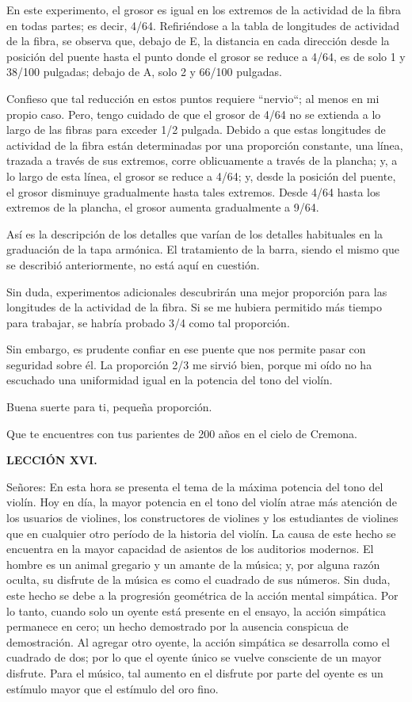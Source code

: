 \documentclass[12pt]{book}
\begin{document}
En este experimento, el grosor es igual en los extremos de la actividad de la fibra en todas partes; es decir, 4/64. Refiriéndose a la tabla de longitudes de actividad de la fibra, se observa que, debajo de E, la distancia en cada dirección desde la posición del puente hasta el punto donde el grosor se reduce a 4/64, es de solo 1 y 38/100 pulgadas; debajo de A, solo 2 y 66/100 pulgadas.

Confieso que tal reducción en estos puntos requiere ``nervio``; al menos en mi propio caso. Pero, tengo cuidado de que el grosor de 4/64 no se extienda a lo largo de las fibras para exceder 1/2 pulgada. Debido a que estas longitudes de actividad de la fibra están determinadas por una proporción constante, una línea, trazada a través de sus extremos, corre oblicuamente a través de la plancha; y, a lo largo de esta línea, el grosor se reduce a 4/64; y, desde la posición del puente, el grosor disminuye gradualmente hasta tales extremos. Desde 4/64 hasta los extremos de la plancha, el grosor aumenta gradualmente a 9/64.

Así es la descripción de los detalles que varían de los detalles habituales en la graduación de la tapa armónica. El tratamiento de la barra, siendo el mismo que se describió anteriormente, no está aquí en cuestión.

Sin duda, experimentos adicionales descubrirán una mejor proporción para las longitudes de la actividad de la fibra. Si se me hubiera permitido más tiempo para trabajar, se habría probado 3/4 como tal proporción.

Sin embargo, es prudente confiar en ese puente que nos permite pasar con seguridad sobre él. La proporción 2/3 me sirvió bien, porque mi oído no ha escuchado una uniformidad igual en la potencia del tono del violín.

Buena suerte para ti, pequeña proporción.

Que te encuentres con tus parientes de 200 años en el cielo de Cremona.

\textbf{LECCIÓN XVI.}

Señores: En esta hora se presenta el tema de la máxima potencia del tono del violín. Hoy en día, la mayor potencia en el tono del violín atrae más atención de los usuarios de violines, los constructores de violines y los estudiantes de violines que en cualquier otro período de la historia del violín. La causa de este hecho se encuentra en la mayor capacidad de asientos de los auditorios modernos. El hombre es un animal gregario y un amante de la música; y, por alguna razón oculta, su disfrute de la música es como el cuadrado de sus números. Sin duda, este hecho se debe a la progresión geométrica de la acción mental simpática. Por lo tanto, cuando solo un oyente está presente en el ensayo, la acción simpática permanece en cero; un hecho demostrado por la ausencia conspicua de demostración. Al agregar otro oyente, la acción simpática se desarrolla como el cuadrado de dos; por lo que el oyente único se vuelve consciente de un mayor disfrute. Para el músico, tal aumento en el disfrute por parte del oyente es un estímulo mayor que el estímulo del oro fino.
\end{document}
